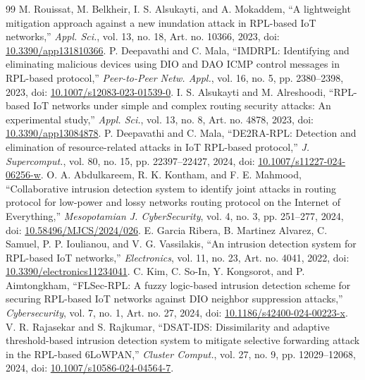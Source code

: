 \begin{thebibliography}{99}
 M. Rouissat, M. Belkheir, I. S. Alsukayti, and A. Mokaddem, ``A lightweight mitigation approach against a new inundation attack in RPL-based IoT networks,'' \emph{Appl. Sci.}, vol. 13, no. 18, Art. no. 10366, 2023, doi: \href{https://doi.org/10.3390/app131810366}{10.3390/app131810366}.
 P. Deepavathi and C. Mala, ``IMDRPL: Identifying and eliminating malicious devices using DIO and DAO ICMP control messages in RPL-based protocol,'' \emph{Peer-to-Peer Netw. Appl.}, vol. 16, no. 5, pp. 2380--2398, 2023, doi: \href{https://doi.org/10.1007/s12083-023-01539-0}{10.1007/s12083-023-01539-0}.
 I. S. Alsukayti and M. Alreshoodi, ``RPL-based IoT networks under simple and complex routing security attacks: An experimental study,'' \emph{Appl. Sci.}, vol. 13, no. 8, Art. no. 4878, 2023, doi: \href{https://doi.org/10.3390/app13084878}{10.3390/app13084878}.
 P. Deepavathi and C. Mala, ``DE2RA-RPL: Detection and elimination of resource-related attacks in IoT RPL-based protocol,'' \emph{J. Supercomput.}, vol. 80, no. 15, pp. 22397--22427, 2024, doi: \href{https://doi.org/10.1007/s11227-024-06256-w}{10.1007/s11227-024-06256-w}.
 O. A. Abdulkareem, R. K. Kontham, and F. E. Mahmood, ``Collaborative intrusion detection system to identify joint attacks in routing protocol for low-power and lossy networks routing protocol on the Internet of Everything,'' \emph{Mesopotamian J. CyberSecurity}, vol. 4, no. 3, pp. 251--277, 2024, doi: \href{https://doi.org/10.58496/MJCS/2024/026}{10.58496/MJCS/2024/026}.
 E. Garcia Ribera, B. Martinez Alvarez, C. Samuel, P. P. Ioulianou, and V. G. Vassilakis, ``An intrusion detection system for RPL-based IoT networks,'' \emph{Electronics}, vol. 11, no. 23, Art. no. 4041, 2022, doi: \href{https://doi.org/10.3390/electronics11234041}{10.3390/electronics11234041}.
 C. Kim, C. So-In, Y. Kongsorot, and P. Aimtongkham, ``FLSec-RPL: A fuzzy logic-based intrusion detection scheme for securing RPL-based IoT networks against DIO neighbor suppression attacks,'' \emph{Cybersecurity}, vol. 7, no. 1, Art. no. 27, 2024, doi: \href{https://doi.org/10.1186/s42400-024-00223-x}{10.1186/s42400-024-00223-x}.
 V. R. Rajasekar and S. Rajkumar, ``DSAT-IDS: Dissimilarity and adaptive threshold-based intrusion detection system to mitigate selective forwarding attack in the RPL-based 6LoWPAN,'' \emph{Cluster Comput.}, vol. 27, no. 9, pp. 12029--12068, 2024, doi: \href{https://doi.org/10.1007/s10586-024-04564-7}{10.1007/s10586-024-04564-7}.

\end{thebibliography}
